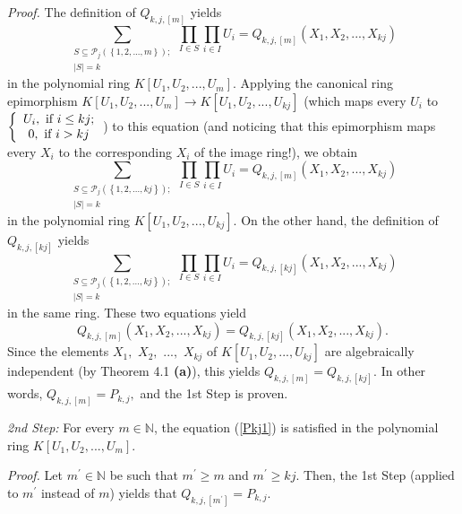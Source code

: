 \documentclass[12pt,final,notitlepage,onecolumn,german]{article}%
\begin{document}
\textit{Proof.} The definition of $Q_{k,j,\left[  m\right]  }$ yields
\[
\sum_{\substack{S\subseteq\mathcal{P}_{j}\left(  \left\{  1,2,...,m\right\}
\right)  ;\\\left\vert S\right\vert =k}}\prod_{I\in S}\prod_{i\in I}%
U_{i}=Q_{k,j,\left[  m\right]  }\left(  X_{1},X_{2},...,X_{kj}\right)
\]
in the polynomial ring $K\left[  U_{1},U_{2},...,U_{m}\right]  $. Applying the
canonical ring epimorphism $K\left[  U_{1},U_{2},...,U_{m}\right]  \rightarrow
K\left[  U_{1},U_{2},...,U_{kj}\right]  $ (which maps every $U_{i}$ to
$\left\{
\begin{array}
[c]{c}%
U_{i},\text{ if }i\leq kj;\\
0,\text{ if }i>kj
\end{array}
\right.  $) to this equation (and noticing that this epimorphism maps every
$X_{i}$ to the corresponding $X_{i}$ of the image ring!), we obtain%
\[
\sum_{\substack{S\subseteq\mathcal{P}_{j}\left(  \left\{  1,2,...,kj\right\}
\right)  ;\\\left\vert S\right\vert =k}}\prod_{I\in S}\prod_{i\in I}%
U_{i}=Q_{k,j,\left[  m\right]  }\left(  X_{1},X_{2},...,X_{kj}\right)
\]
in the polynomial ring $K\left[  U_{1},U_{2},...,U_{kj}\right]  $. On the
other hand, the definition of $Q_{k,j,\left[  kj\right]  }$ yields%
\[
\sum_{\substack{S\subseteq\mathcal{P}_{j}\left(  \left\{  1,2,...,kj\right\}
\right)  ;\\\left\vert S\right\vert =k}}\prod_{I\in S}\prod_{i\in I}%
U_{i}=Q_{k,j,\left[  kj\right]  }\left(  X_{1},X_{2},...,X_{kj}\right)
\]
in the same ring. These two equations yield%
\[
Q_{k,j,\left[  m\right]  }\left(  X_{1},X_{2},...,X_{kj}\right)
=Q_{k,j,\left[  kj\right]  }\left(  X_{1},X_{2},...,X_{kj}\right)  .
\]
Since the elements $X_{1},$ $X_{2},$ $...,$ $X_{kj}$ of $K\left[  U_{1}%
,U_{2},...,U_{kj}\right]  $ are algebraically independent (by Theorem 4.1
\textbf{(a)}), this yields $Q_{k,j,\left[  m\right]  }=Q_{k,j,\left[
kj\right]  }.$ In other words, $Q_{k,j,\left[  m\right]  }=P_{k,j},$ and the
1st Step is proven.

\textit{2nd Step:} For every $m\in\mathbb{N}$, the equation (\ref{Pkj1}) is
satisfied in the polynomial ring $K\left[  U_{1},U_{2},...,U_{m}\right]  $.

\textit{Proof.} Let $m^{\prime}\in\mathbb{N}$ be such that $m^{\prime}\geq m$
and $m^{\prime}\geq kj$. Then, the 1st Step (applied to $m^{\prime}$ instead
of $m$) yields that $Q_{k,j,\left[  m^{\prime}\right]  }=P_{k,j}.$
\end{document}
